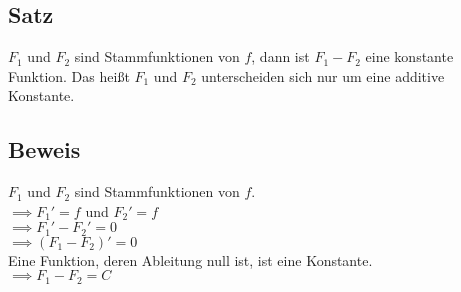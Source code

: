 \documentclass[12pt, a4paper]{report}
\begin{document}
\subsection{Satz}
$F_1$ und $F_2$ sind Stammfunktionen von $f$, dann ist $F_1-F_2$ eine konstante Funktion. Das heißt $F_1$ und $F_2$ unterscheiden sich nur um eine additive Konstante.

\subsection{Beweis}
$F_1$ und $F_2$ sind Stammfunktionen von $f$.\\
$\implies F_1' = f$ und $F_2' = f$\\
$\implies F_1'-F_2' = 0$\\
$\implies (F_1-F_2)' = 0$\\
Eine Funktion, deren Ableitung null ist, ist eine Konstante.\\
$\implies F_1-F_2 = C$
\end{document}
